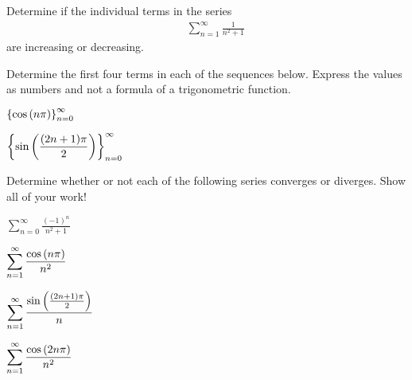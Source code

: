 
\begin{problem}
\item Determine if the individual terms in the series
  \begin{eqnarray*}
    & & \sum^\infty_{n=1} \frac{1}{n^2+1}
  \end{eqnarray*}
  are increasing or decreasing.

    \vfill


  \item  Determine the first four terms in each of the sequences below. Express the values as numbers and not a formula of a trigonometric function.
    \begin{subproblem}
      \item $\displaystyle \left\{ \cos\left( n\pi \right)\right\}_{n=0}^\infty$
        \vfill
      \item $\displaystyle \left\{ \sin\left( \frac{(2n+1)\pi}{2}\right)\right\}_{n=0}^\infty$
        \vfill
    \end{subproblem}
\end{problem}


\begin{problem}
\item Determine whether or not each of the following series converges
  or diverges. Show all of your work!
  \begin{subproblem}
    \item $\displaystyle \sum_{n=0}^\infty \frac{(-1)^n}{n^2+1}$
      \vfill
    \item $\displaystyle \sum_{n=1}^\infty \frac{\cos\left( n\pi \right)}{n^2}$
      \vfill
      \clearpage
    \item $\displaystyle \sum_{n=1}^\infty \frac{\sin\left(\frac{(2n+1)\pi}{2}\right)}{n} $
      \vfill
    \item $\displaystyle \sum_{n=1}^\infty \frac{\cos\left( 2n\pi \right)}{n^2}$
      \vfill
  \end{subproblem}
\end{problem}



